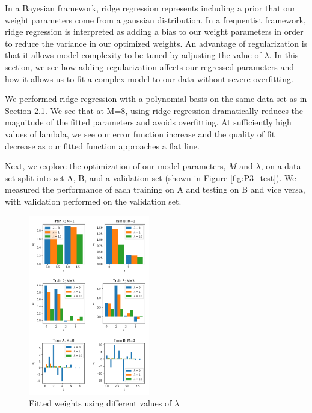 \documentclass[10pt, twocolumn]{article}
\begin{document}
In a Bayesian framework, ridge regression represents including a prior that our weight parameters come from a gaussian distribution. In a frequentist framework, ridge regression is interpreted as adding a bias to our weight parameters in order to reduce the variance in our optimized weights. An advantage of regularization is that it allows model complexity to be tuned by adjusting the value of $\lambda$. In this section, we see how adding regularization affects our regressed parameters and how it allows us to fit a complex model to our data without severe overfitting.


We performed ridge regression with a polynomial basis on the same data set as in Section 2.1. We see that at M=8, using ridge regression dramatically reduces the magnitude of the fitted parameters and avoids overfitting. At sufficiently high values of lambda, we see our error function increase and the quality of fit decrease as our fitted function approaches a flat line.


Next, we explore the optimization of our model parameters, $M$ and $\lambda$, on a data set split into set A, B, and a validation set (shown in Figure \ref{fig:P3_test}). We measured the performance of each training on A and testing on B and vice versa, with validation performed on the validation set.

\begin{figure}
\caption{Fitted weights using different values of $\lambda$}
\begin{center}
\includegraphics[width=200px]{P3_all_weights}
\end{center}
\label{fig:P3_all_weights}
\end{figure}
\end{document}

